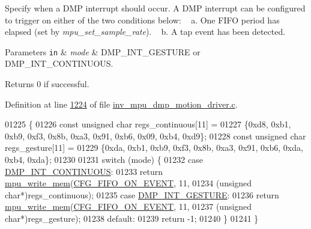 Specify when a D\+MP interrupt should occur. A D\+MP interrupt can be configured to trigger on either of the two conditions below\+: ~\newline
 a. One F\+I\+FO period has elapsed (set by {\itshape mpu\+\_\+set\+\_\+sample\+\_\+rate}). ~\newline
 b. A tap event has been detected. 


\begin{DoxyParams}[1]{Parameters}
\mbox{\tt in}  & {\em mode} & D\+M\+P\+\_\+\+I\+N\+T\+\_\+\+G\+E\+S\+T\+U\+RE or D\+M\+P\+\_\+\+I\+N\+T\+\_\+\+C\+O\+N\+T\+I\+N\+U\+O\+US. \\
\hline
\end{DoxyParams}
\begin{DoxyReturn}{Returns}
0 if successful. 
\end{DoxyReturn}


Definition at line \hyperlink{inv__mpu__dmp__motion__driver_8c_source_l01224}{1224} of file \hyperlink{inv__mpu__dmp__motion__driver_8c_source}{inv\+\_\+mpu\+\_\+dmp\+\_\+motion\+\_\+driver.\+c}.


\begin{DoxyCode}
01225 \{
01226     \textcolor{keyword}{const} \textcolor{keywordtype}{unsigned} \textcolor{keywordtype}{char} regs\_continuous[11] =
01227         \{0xd8, 0xb1, 0xb9, 0xf3, 0x8b, 0xa3, 0x91, 0xb6, 0x09, 0xb4, 0xd9\};
01228     \textcolor{keyword}{const} \textcolor{keywordtype}{unsigned} \textcolor{keywordtype}{char} regs\_gesture[11] =
01229         \{0xda, 0xb1, 0xb9, 0xf3, 0x8b, 0xa3, 0x91, 0xb6, 0xda, 0xb4, 0xda\};
01230 
01231     \textcolor{keywordflow}{switch} (mode) \{
01232     \textcolor{keywordflow}{case} \hyperlink{group___d_r_i_v_e_r_s_gaabccda0e9ccd1a2f4287d23fe4b0c776}{DMP\_INT\_CONTINUOUS}:
01233         \textcolor{keywordflow}{return} \hyperlink{group___d_r_i_v_e_r_s_gafea59910bc3dd30ba3356b1c75213a5f}{mpu\_write\_mem}(\hyperlink{group___d_r_i_v_e_r_s_ga7aa6ed56d6fd41be120b9bdb488c220a}{CFG\_FIFO\_ON\_EVENT}, 11,
01234             (\textcolor{keywordtype}{unsigned} \textcolor{keywordtype}{char}*)regs\_continuous);
01235     \textcolor{keywordflow}{case} \hyperlink{group___d_r_i_v_e_r_s_gaab5d80253aaee2470c95c6981b731255}{DMP\_INT\_GESTURE}:
01236         \textcolor{keywordflow}{return} \hyperlink{group___d_r_i_v_e_r_s_gafea59910bc3dd30ba3356b1c75213a5f}{mpu\_write\_mem}(\hyperlink{group___d_r_i_v_e_r_s_ga7aa6ed56d6fd41be120b9bdb488c220a}{CFG\_FIFO\_ON\_EVENT}, 11,
01237             (\textcolor{keywordtype}{unsigned} \textcolor{keywordtype}{char}*)regs\_gesture);
01238     \textcolor{keywordflow}{default}:
01239         \textcolor{keywordflow}{return} -1;
01240     \}
01241 \}
\end{DoxyCode}
